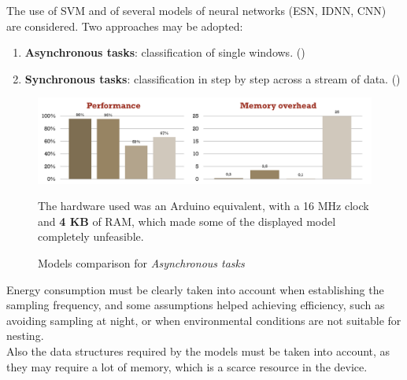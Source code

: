 \begin{paracol}{2}
   

   The use of SVM and of several models of neural networks (ESN, IDNN, CNN) are considered. Two approaches may be adopted:
   \begin{enumerate}
      \item \textbf{Asynchronous tasks}: classification of single windows. ()
      \item \textbf{Synchronous tasks}: classification in step by step across a stream of data. ()
   \end{enumerate}
   
   \switchcolumn

   \begin{figure}[htbp]
      \centering
      \includegraphics{images/tortoise@_modelcomparison.png}
      \caption{Models comparison for \textit{Asynchronous tasks}}
      \label{fig:tortoise_modelcomparison}
      The hardware used was an Arduino equivalent, with a 16 MHz clock and \textbf{4 KB} of RAM, which made some of the displayed model completely unfeasible.
   \end{figure}
\end{paracol}

Energy consumption must be clearly taken into account when establishing the sampling frequency, and some assumptions helped achieving efficiency, such as avoiding sampling at night, or when environmental conditions are not suitable for nesting.\\
Also the data structures required by the models must be taken into account, as they may require a lot of memory, which is a scarce resource in the device.

